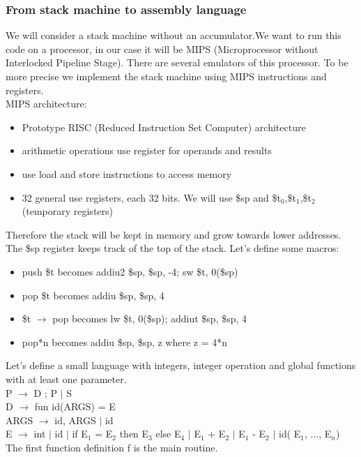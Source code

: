 \documentclass[12pt]{article}
\begin{document}
\subsubsection{From stack machine to assembly language} 
We will consider a stack machine without an accumulator.We want to run this code on a processor, in our case it will be MIPS (Microprocessor without Interlocked Pipeline Stage). There are several emulators of this processor.
To be more precise we implement the stack machine using MIPS instructions and registers.
\\ MIPS architecture: 
\begin{itemize}
    \item Prototype RISC (Reduced Instruction Set Computer) architecture
    \item arithmetic operations use register for operands and results 
    \item use load and store instructions to access memory
    \item 32 general use registers, each 32 bits. We will use \$sp and \$t$_0$,\$t$_1$,\$t$_2$ (temporary registers)
\end{itemize}
Therefore the stack will be kept in memory and grow towards lower addresses. The \$sp register keeps track of the top of the stack. Let's define some macros: 
\begin{itemize}
    \item push \$t becomes addiu2 \$sp, \$sp, -4; sw \$t, 0(\$sp)
    \item pop \$t becomes addiu \$sp, \$sp, 4
    \item \$t $\rightarrow$ pop becomes lw \$t, 0(\$sp); addiut \$sp, \$sp, 4
    \item pop*n becomes addiu \$sp, \$sp, z where z = 4*n
\end{itemize}
Let's define a small language with integers, integer operation and global functions with at least one parameter.
\\ \hspace*{5mm} P $\rightarrow$ D ; P $|$ S
\\ \hspace*{5mm} D $\rightarrow$ fun id(ARGS) = E
\\ \hspace*{5mm} ARGS $\rightarrow$ id, ARGS $|$ id
\\ \hspace*{5mm} E $\rightarrow$ int $|$ id $|$ if E$_1$ = E$_2$ then E$_3$ else E$_4$ $|$ E$_1$ + E$_2$ $|$ E$_1$ - E$_2$ $|$ id( E$_1$, ..., E$_n$)
\\ \vspace{3mm} The first function definition f is the main routine.
\end{document}

